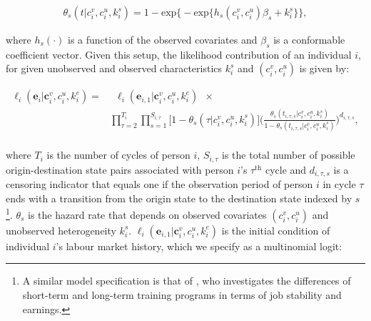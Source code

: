 \documentclass[12pt, a4paper]{article}
\begin{document}
\begin{align}
\theta_{s}(t|c_i^v,c_i^u,k_{i}^{s}) = 1 - \text{exp} \Big\{ - \text{exp}\{h_{s}(c_i^{v},c_i^u)\beta_{s}+k_{i}^{s}\}\Big\},
\end{align} 

where $h_{s}(\cdot)$ is a function of the observed covariates and $\beta_{s}$ is a conformable coefficient vector. Given this setup, the likelihood contribution of an individual $i$, for given unobserved and observed characteristics $k_{i}^{s}$ and $(c_{i}^{v},c_{i}^{u})$ is given by:

\begin{align}\label{eq:Likelihood_states}
\ell_{i}(\textbf{e}_i|\textbf{c}_i^v,c_i^u,k_i^e)  = &\,\,\, \ell_{i}(\textbf{e}_{i,1}|\textbf{c}_i^v,c_i^u,k_i^e)\,\,\, \times \\ \nonumber & \prod_{\tau=2}^{T_i} \prod_{s=1}^{S_{i,\tau}} \Big[1-\theta_{s}(\tau|c_i^v,c_i^u,k_{i}^{s})\Big] \Big(\frac{\theta_{s}(t_{i,\tau,s}|c_i^v,c_i^u,k_{i}^{s})}{1-\theta_{s}(t_{i,\tau,s}|c_i^v,c_i^u,k_{i}^{s})} \Big)^{d_{i,\tau,s}}, \\ \nonumber
\end{align}


where $T_i$ is the number of cycles of person $i$, $S_{i,\tau}$ is the total number of possible origin-destination state pairs associated with person $i$'s $\tau^{\text{th}}$ cycle and $d_{i,\tau,s}$ is a censoring indicator that equals one if the observation period of person $i$ in cycle $\tau$ ends with a transition from the origin state to the destination state indexed by $s$\footnote{A similar model specification is that of \cite{Osi2012}, who investigates the differences of short-term and long-term training programs in terms of job stability and earnings.}. $\theta_{s}$ is the hazard rate that depends on observed covariates $(c_{i}^{v},c_{i}^{u})$ and unobserved heterogeneity $k_{i}^{s}$. $\ell_{i}(\textbf{e}_{i,1}|\textbf{c}_i^v,c_i^u,k_i^e)$ is the initial condition of individual $i$'s labour market history, which we specify as a multinomial logit:
\end{document}
